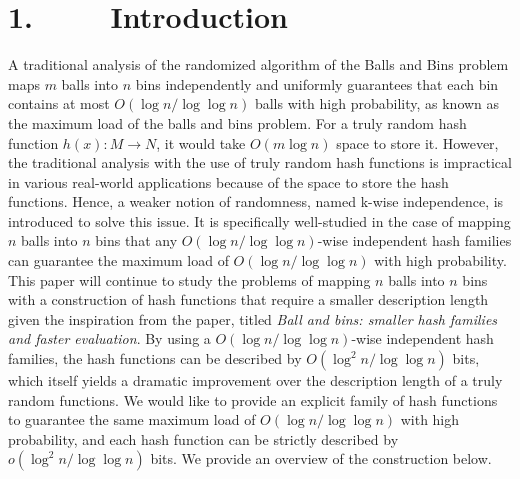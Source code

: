 \documentclass[a4paper, english]{paper}
\begin{document}
	\section{1. $\qquad$ Introduction}
\quad	A traditional analysis of the randomized algorithm of the Balls and Bins problem maps $m$ balls into $n$ bins independently and uniformly guarantees that each bin contains at most $O(\log n/\log\log n)$ balls with high probability, as known as the maximum load of the balls and bins problem. For a truly random hash function $h(x): M \rightarrow N$, it would take $O(m\log n)$ space to store it. However, the traditional analysis with the use of truly random hash functions is impractical in various real-world applications because of the space to store the hash functions. Hence, a weaker notion of randomness, named k-wise independence, is introduced to solve this issue. It is specifically well-studied in the case of mapping $n$ balls into $n$ bins that any $O(\log n/\log\log n)$-wise independent hash families can guarantee the maximum load of $O(\log n/\log\log n)$ with high probability. \\
	\indent This paper will continue to study the problems of mapping $n$ balls into $n$ bins with a construction of hash functions that require a smaller description length given the inspiration from the paper, titled \textit{Ball and bins: smaller hash families and faster evaluation}. By using a $O(\log n/\log\log n)$-wise independent hash families, the hash functions can be described by $O(\log^2 n/\log\log n)$ bits, which itself yields a dramatic improvement over the description length of a truly random functions. We would like to provide an explicit family of hash functions to guarantee the same maximum load of $O(\log n/\log\log n)$ with high probability, and each hash function can be strictly described by $o(\log^2 n/\log\log n)$ bits. We provide an overview of the construction below.   \\
	
\end{document}
